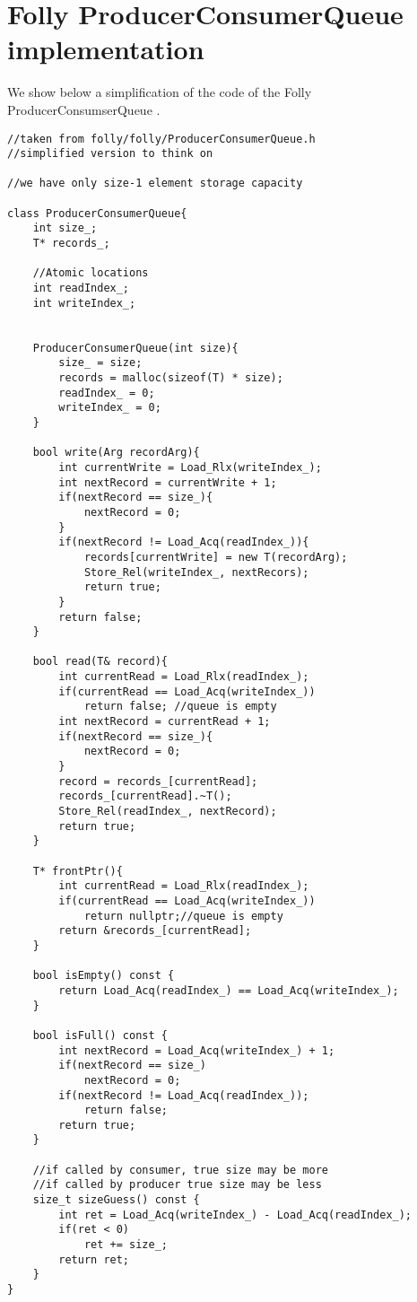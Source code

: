 \chapter{Folly ProducerConsumerQueue implementation}
\label{app:queue}
 We show below a simplification of the code of the Folly ProducerConsumserQueue \cite{queue}.

 \begin{lstlisting}
//taken from folly/folly/ProducerConsumerQueue.h
//simplified version to think on

//we have only size-1 element storage capacity

class ProducerConsumerQueue{
	int size_;
	T* records_;

	//Atomic locations
	int readIndex_;
	int writeIndex_;

	
	ProducerConsumerQueue(int size){
		size_ = size;
		records = malloc(sizeof(T) * size);
		readIndex_ = 0;
		writeIndex_ = 0;
	}	

	bool write(Arg recordArg){
		int currentWrite = Load_Rlx(writeIndex_);
		int nextRecord = currentWrite + 1;
		if(nextRecord == size_){
			nextRecord = 0;
		}
		if(nextRecord != Load_Acq(readIndex_)){
			records[currentWrite] = new T(recordArg);
			Store_Rel(writeIndex_, nextRecors);
			return true;
		}
		return false;
	}

	bool read(T& record){
		int currentRead = Load_Rlx(readIndex_);
		if(currentRead == Load_Acq(writeIndex_))
			return false; //queue is empty
		int nextRecord = currentRead + 1;
		if(nextRecord == size_){
			nextRecord = 0;
		}
		record = records_[currentRead];
		records_[currentRead].~T();
		Store_Rel(readIndex_, nextRecord);
		return true;
	}

	T* frontPtr(){
		int currentRead = Load_Rlx(readIndex_);
		if(currentRead == Load_Acq(writeIndex_))
			return nullptr;//queue is empty
		return &records_[currentRead];
	}
	
	bool isEmpty() const {
		return Load_Acq(readIndex_) == Load_Acq(writeIndex_);
	}

	bool isFull() const {
		int nextRecord = Load_Acq(writeIndex_) + 1;
		if(nextRecord == size_)
			nextRecord = 0;
		if(nextRecord != Load_Acq(readIndex_));
			return false;
		return true;
	}

	//if called by consumer, true size may be more
	//if called by producer true size may be less
	size_t sizeGuess() const {
		int ret = Load_Acq(writeIndex_) - Load_Acq(readIndex_);
		if(ret < 0)
			ret += size_;
		return ret;
	}
}
 \end{lstlisting}
